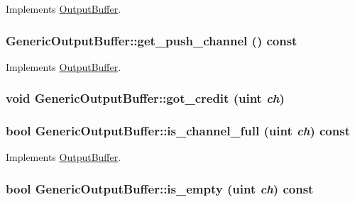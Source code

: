 Implements \hyperlink{classOutputBuffer_c4460c1a1ac34667c12cc77c57a393b9}{OutputBuffer}.\hypertarget{classGenericOutputBuffer_d7f10031a96719bc97a11d3a96f4ef6f}{
\subsubsection[{get\_\-push\_\-channel}]{ GenericOutputBuffer::get\_\-push\_\-channel () const}}
\label{classGenericOutputBuffer_d7f10031a96719bc97a11d3a96f4ef6f}




Implements \hyperlink{classOutputBuffer_bafd65458146d9b383643fef94b38881}{OutputBuffer}.\hypertarget{classGenericOutputBuffer_a61d09c8b3fcdd15b71f1b01d28ea748}{
\subsubsection[{got\_\-credit}]{\setlength{\rightskip}{0pt plus 5cm}void GenericOutputBuffer::got\_\-credit ({\bf uint} {\em ch})}}
\label{classGenericOutputBuffer_a61d09c8b3fcdd15b71f1b01d28ea748}


\hypertarget{classGenericOutputBuffer_cc3ce27817dea583b8c0cb269b3c9cdb}{
\subsubsection[{is\_\-channel\_\-full}]{\setlength{\rightskip}{0pt plus 5cm}bool GenericOutputBuffer::is\_\-channel\_\-full ({\bf uint} {\em ch}) const}}
\label{classGenericOutputBuffer_cc3ce27817dea583b8c0cb269b3c9cdb}




Implements \hyperlink{classOutputBuffer_23aaeb2aa62e944596d50a569ed5d859}{OutputBuffer}.\hypertarget{classGenericOutputBuffer_df867815a21d8e832ba19aa63fa65e55}{
\subsubsection[{is\_\-empty}]{\setlength{\rightskip}{0pt plus 5cm}bool GenericOutputBuffer::is\_\-empty ({\bf uint} {\em ch}) const}}
\label{classGenericOutputBuffer_df867815a21d8e832ba19aa63fa65e55}




